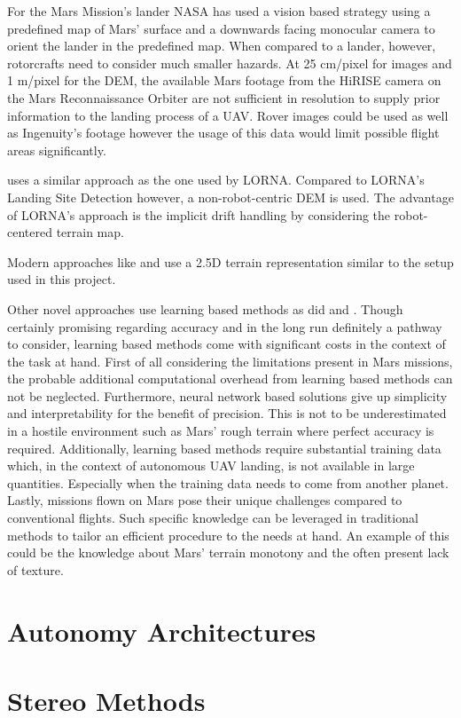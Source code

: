 For the Mars Mission's lander NASA has used a vision based strategy using a predefined map of Mars' surface and a downwards facing monocular camera to orient the lander in the predefined map\citep{Johnson2020Mars2020}. When compared to a lander, however, rotorcrafts need to consider much smaller hazards. At 25 cm/pixel for images and 1 m/pixel for the DEM, the available Mars footage from the HiRISE camera on the Mars Reconnaissance Orbiter are not sufficient in resolution to supply prior information to the landing process of a UAV. Rover images could be used as well as Ingenuity's footage however the usage of this data would limit possible flight areas significantly.

\citep{Johnson2005VisionGuided} uses a similar approach as the one used by LORNA. Compared to LORNA's Landing Site Detection \citep{LSD1,LSD2} however, a non-robot-centric DEM is used. The advantage of LORNA's approach is the implicit drift handling by considering the robot-centered terrain map.

Modern approaches like \citep{Fankhauser2014RobotCentric, Forster2015Continuous} and \citep{Daftry2018Robust} use a 2.5D terrain representation similar to the setup used in this project.

Other novel approaches use learning based methods as did \citep{Neves2024Multimodal, Abdollahzadeh2022SafeLandingZones} and \citep{TovanchePicon2024RealTimeSafeValidation}. Though certainly promising regarding accuracy and in the long run definitely a pathway to consider, learning based methods come with significant costs in the context of the task at hand. First of all considering the limitations present in Mars missions, the probable additional computational overhead from learning based methods can not be neglected. Furthermore, neural network based solutions give up simplicity and interpretability for the benefit of precision. This is not to be underestimated in a hostile environment such as Mars' rough terrain where perfect accuracy is required. Additionally, learning based methods require substantial training data which, in the context of autonomous UAV landing, is not available in large quantities. Especially when the training data needs to come from another planet. Lastly, missions flown on Mars pose their unique challenges compared to conventional flights. Such specific knowledge can be leveraged in traditional methods to tailor an efficient procedure to the needs at hand. An example of this could be the knowledge about Mars' terrain monotony and the often present lack of texture.

\section{Autonomy Architectures}

\section{Stereo Methods}\label{sec:rel_stereo}